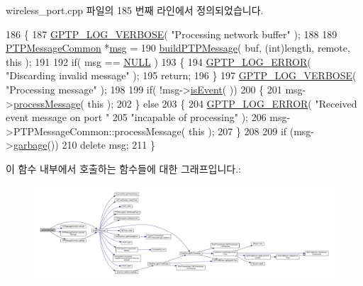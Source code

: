 wireless\+\_\+port.\+cpp 파일의 185 번째 라인에서 정의되었습니다.


\begin{DoxyCode}
186 \{
187     \hyperlink{gptp__log_8hpp_add03384a2a8099b27e07d041cce77e6f}{GPTP\_LOG\_VERBOSE}( \textcolor{stringliteral}{"Processing network buffer"} );
188 
189     \hyperlink{class_p_t_p_message_common}{PTPMessageCommon} *\hyperlink{maap__log__linux_8c_a0c7e58a50354c4a4d6dad428d0e47029}{msg} =
190         \hyperlink{avbts__message_8hpp_a3f587ce328a50a9f7af19f9822579d0d}{buildPTPMessage}( buf, (\textcolor{keywordtype}{int})length, remote, \textcolor{keyword}{this} );
191 
192     \textcolor{keywordflow}{if}( msg == \hyperlink{openavb__types__base__pub_8h_a070d2ce7b6bb7e5c05602aa8c308d0c4}{NULL} )
193     \{
194         \hyperlink{gptp__log_8hpp_afefbb1009717c128012bfeed94842987}{GPTP\_LOG\_ERROR}( \textcolor{stringliteral}{"Discarding invalid message"} );
195         \textcolor{keywordflow}{return};
196     \}
197     \hyperlink{gptp__log_8hpp_add03384a2a8099b27e07d041cce77e6f}{GPTP\_LOG\_VERBOSE}( \textcolor{stringliteral}{"Processing message"} );
198 
199     \textcolor{keywordflow}{if}( !msg->\hyperlink{class_p_t_p_message_common_a2dd36fdb6a9dbfcfdab03f6162581373}{isEvent}( ))
200     \{
201         msg->\hyperlink{class_p_t_p_message_common_a45670a42f5684252d52543f9ed3a1551}{processMessage}( \textcolor{keyword}{this} );
202     \} \textcolor{keywordflow}{else}
203     \{
204         \hyperlink{gptp__log_8hpp_afefbb1009717c128012bfeed94842987}{GPTP\_LOG\_ERROR}( \textcolor{stringliteral}{"Received event message on port "}
205                 \textcolor{stringliteral}{"incapable of processing"} );
206         msg->PTPMessageCommon::processMessage( \textcolor{keyword}{this} );
207     \}
208 
209     \textcolor{keywordflow}{if} (msg->\hyperlink{class_p_t_p_message_common_a1a2b4b1eeb289619b14affa39f8284f7}{garbage}())
210         \textcolor{keyword}{delete} msg;
211 \}
\end{DoxyCode}


이 함수 내부에서 호출하는 함수들에 대한 그래프입니다.\+:
\nopagebreak
\begin{figure}[H]
\begin{center}
\leavevmode
\includegraphics[width=350pt]{class_wireless_port_a3a562fa917715c602f5b750f8d2bdc81_cgraph}
\end{center}
\end{figure}




